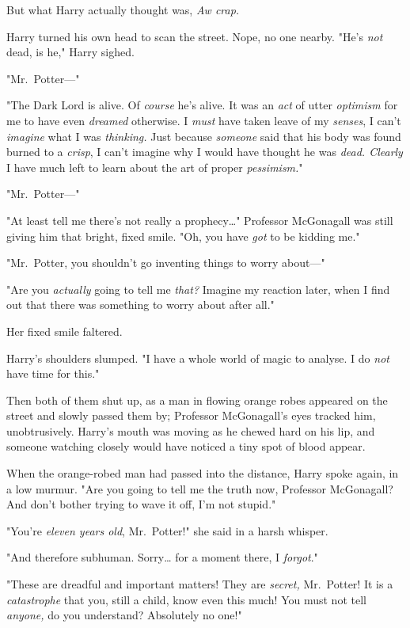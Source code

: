 But what Harry actually thought was, \emph{Aw crap.}

Harry turned his own head to scan the street. Nope, no one nearby. "He's
\emph{not} dead, is he," Harry sighed.

"Mr.~Potter---"

"The Dark Lord is alive. Of \emph{course} he's alive. It was an \emph{act} of
utter \emph{optimism} for me to have even \emph{dreamed} otherwise. I
\emph{must} have taken leave of my \emph{senses}, I can't \emph{imagine} what I
was \emph{thinking.} Just because \emph{someone} said that his body was found
burned to a \emph{crisp}, I can't imagine why I would have thought he was
\emph{dead. Clearly} I have much left to learn about the art of proper
\emph{pessimism.}"

"Mr.~Potter---"

"At least tell me there's not really a prophecy{\ldots}" Professor McGonagall
was still giving him that bright, fixed smile. "Oh, you have \emph{got} to be
kidding me."

"Mr.~Potter, you shouldn't go inventing things to worry about---"

"Are you \emph{actually} going to tell me \emph{that?} Imagine my reaction
later, when I find out that there was something to worry about after all."

Her fixed smile faltered.

Harry's shoulders slumped. "I have a whole world of magic to analyse. I do
\emph{not} have time for this."

Then both of them shut up, as a man in flowing orange robes appeared on the
street and slowly passed them by; Professor McGonagall's eyes tracked him,
unobtrusively. Harry's mouth was moving as he chewed hard on his lip, and
someone watching closely would have noticed a tiny spot of blood appear.

When the orange-robed man had passed into the distance, Harry spoke again, in a
low murmur. "Are you going to tell me the truth now, Professor McGonagall? And
don't bother trying to wave it off, I'm not stupid."

"You're \emph{eleven years old}, Mr.~Potter!" she said in a harsh whisper.

"And therefore subhuman. Sorry{\ldots} for a moment there, I \emph{forgot}."

"These are dreadful and important matters! They are \emph{secret,} Mr.~Potter!
It is a \emph{catastrophe} that you, still a child, know even this much! You
must not tell \emph{anyone,} do you understand? Absolutely no one!"

